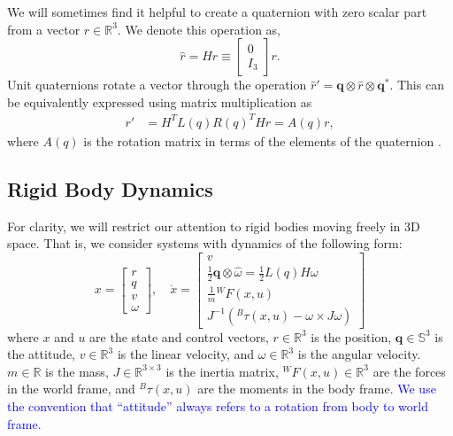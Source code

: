 \documentclass[letterpaper, 10 pt, conference]{ieeeconf}  %
\newcommand{\half}{\frac{1}{2}}
\newcommand{\R}{\mathbb{R}}
\newcommand{\Q}{\mathbb{S}^3}
\newcommand{\q}{\textbf{q}}
\newcommand{\inframe}[2]{{}^{#1}\!#2}
\newcommand{\added}[1]{\textcolor{blue}{#1}}
\begin{document}
        We will sometimes find it helpful to create a quaternion with zero scalar part from 
        a vector $r \in \R^3$. We denote this operation as,
        \begin{equation}
            \hat{r} = H r \equiv \begin{bmatrix} 0 \\ I_3 \end{bmatrix} r.
        \end{equation}
        Unit quaternions rotate a vector through the operation 
        $\hat{r}' = \q \otimes \hat{r} \otimes \q^*$. 
        This can be equivalently expressed using matrix multiplication as
        \begin{align} 
            r' &= H^T L(q) R(q)^T H r = A(q)r , \label{eq:quaternion_rotation}
        \end{align}
        where $A(q)$ is the rotation matrix in terms of the elements of the quaternion 
        \cite{kane1983spacecraftdynamics}.

    \subsection{Rigid Body Dynamics} \label{sec:rigidbody_dynamics}
        For clarity, we will restrict our attention to rigid bodies moving freely in 3D 
        space. That is, we consider systems with dynamics of the following form:
        \begin{equation} \label{eq:rigid_body_dynamics}
            x = \begin{bmatrix} r \\ q \\ v \\ \omega \end{bmatrix}, \quad 
            \dot{x} = \begin{bmatrix} 
                v \\ 
                \half \q \otimes \hat{\omega} = \half L(q) H \omega \\ 
                \frac{1}{m} \inframe{W}{F(x,u)} \\ 
                J^{-1}(\inframe{B}{\tau(x,u)} - \omega \times J \omega) 
            \end{bmatrix}
        \end{equation}
        where $x$ and $u$ are the state and control vectors, $r \in \R^3$ is the
        position, $\q \in \Q$ is the attitude, $v \in \R^3$ is the linear velocity, and
        $\omega \in \R^3$ is the angular velocity. $m \in \R$ is the mass, $J \in
        \R^{3\times3}$ is the inertia matrix, $\inframe{W}{F(x,u)} \in \R^3$ are the
        forces in the world frame, and $\inframe{B}{\tau(x,u)}$ are the moments in the
        body frame. \added{We use the convention that ``attitude'' always refers to a rotation from body to world frame.}
\end{document}
